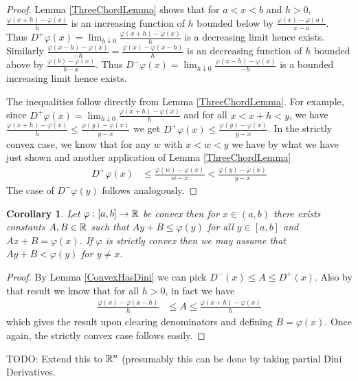 \documentclass{amsart}
\newtheorem{cor}[thm]{Corollary}
\theoremstyle{remark}
\theoremstyle{definition}
\begin{document}
\begin{proof}
Lemma \ref{ThreeChordLemma} shows that for $a < x < b$ and $h > 0$,
$\frac{\varphi(x + h) - \varphi(x)}{h}$ is an increasing function of
$h$ bounded below by $\frac{\varphi(x) - \varphi(a)}{x - a}$.  Thus $D^+\varphi(x) = \lim_{h \downarrow 0} \frac{\varphi(x + h) -
  \varphi(x)}{h}$ is a decreasing limit hence exists.
Similarly $\frac{\varphi(x - h) -
  \varphi(x)}{-h}=\frac{\varphi(x)-\varphi(x - h)}{h}$ is an decreasing
function of $h$ bounded above by $\frac{\varphi(b) - \varphi(x)}{b - x}$.  Thus $D^-\varphi(x) = \lim_{h \downarrow 0} \frac{\varphi(x - h) -
  \varphi(x)}{-h}$ is a bounded increasing limit hence
exists.  

The inequalities follow directly from Lemma \ref{ThreeChordLemma}.
For example, since $D^+\varphi(x) = \lim_{h \downarrow 0} \frac{\varphi(x + h) -
  \varphi(x)}{h}$ and for all $x < x+h < y$, we have $\frac{\varphi(x + h) -
  \varphi(x)}{h} \leq \frac{\varphi(y) -
  \varphi(x)}{y-x}$ we get $D^+\varphi(x) \leq \frac{\varphi(y) -
  \varphi(x)}{y-x}$.  In the strictly convex case, we know that for
any $w$ with
$x < w < y$ we have  by what we have just shown and
another application of Lemma \ref{ThreeChordLemma}
\begin{align*}
D^+\varphi(x) &\leq \frac{\varphi(w) -
  \varphi(x)}{w-x} < \frac{\varphi(y) -
  \varphi(x)}{y-x}
\end{align*}  The case of $D^-\varphi(y)$ follows analogously.
\end{proof}
\begin{cor}\label{ConvexHasSubderivative}Let $\varphi : [a,b] \to
  \mathbb{R}$ be convex then for $x \in (a,b)$ there exists constants $A,B
  \in \mathbb{R}$ such that $Ay + B \leq \varphi(y)$ for all $y \in [a,b]$
  and $Ax + B = \varphi(x)$.  If $\varphi$ is strictly convex then we
  may assume that $Ay + B < \varphi(y)$ for $y \neq x$.
\end{cor}
\begin{proof}
By Lemma \ref{ConvexHasDini} we can pick $D^-(x) \leq A \leq D^+(x)$.
Also by that result we know that for all $h > 0$, in fact we
have
\begin{align*}
\frac{\varphi(x) - \varphi(x-h)}{h} &\leq A \leq \frac{\varphi(x+h) - \varphi(x)}{h}
\end{align*}
which gives the result upon clearing denominators and defining $B =
\varphi(x)$.
Once again, the strictly convex case follows easily.
\end{proof}
TODO: Extend this to $\mathbb{R}^n$ (presumably this can be done by taking
partial Dini Derivatives.
\end{document}

